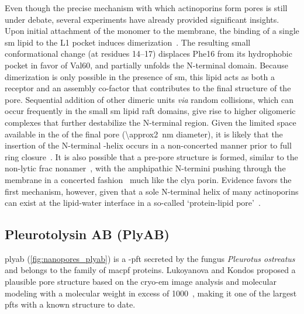 Even though the precise mechanism with which actinoporins form pores is still under debate, several
experiments have already provided significant insights. Upon initial attachment of the monomer to the
membrane, the binding of a single \gls{sm} lipid to the L1 pocket induces dimerization~\cite{Tanaka-2015}. The
resulting small conformational change (at residues 14--17) displaces Phe16 from its hydrophobic pocket in
favor of Val60, and partially unfolds the N-terminal domain. Because dimerization is only possible in the
presence of \gls{sm}, this lipid acts as both a receptor and an assembly co-factor that contributes to the
final structure of the pore. Sequential addition of other dimeric units \textit{via} random collisions, which
can occur frequently in the small \gls{sm} lipid raft domains, give rise to higher oligomeric complexes that
further destabilize the N-terminal region. Given the limited space available in the \lumen{} of the final pore
(\SI{\approx2}{\nm} diameter), it is likely that the insertion of the N-terminal \ta-helix occurs in a
non-concerted manner prior to full ring closure~\cite{Cosentino-2016}. It is also possible that a pre-pore
structure is formed, similar to the non-lytic \gls{frac} nonamer~\cite{Mechaly-2011}, with the amphipathic
N-termini pushing through the membrane in a concerted fashion~\cite{Tanaka-2015,Rojko-2016} much like the
\gls{clya} porin. Evidence favors the first mechanism, however, given that a sole N-terminal helix of many
actinoporins can exist at the lipid-water interface in a so-called `protein-lipid pore'~\cite{Cosentino-2016}.

%
\clearpage
%

%
\subsection{Pleurotolysin AB (PlyAB)}
%
\label{sec:np:plyab}
%

\Gls{plyab} (\cref{fig:nanopores_plyab}) is a \tb-\gls{pft} secreted by the fungus \textit{Pleurotus
ostreatus} and belongs to the family of \gls{macpf} proteins. Lukoyanova and Kondos \etal{} proposed a
plausible pore structure based on the \gls{cryo-em} image analysis and molecular modeling with a molecular
weight in excess of \SI{1000}{\kDa}~\cite{Lukoyanova-Kondos-2015}, making it one of the largest \glspl{pft}
with a known structure to date.

